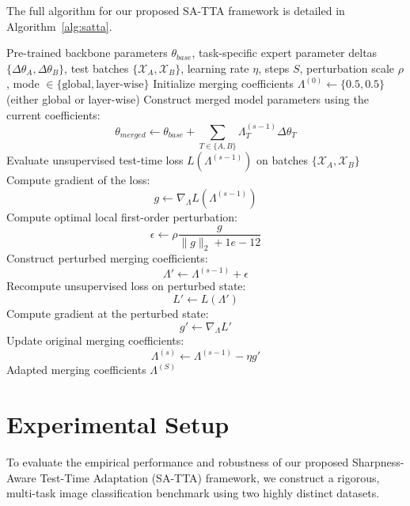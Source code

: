 \documentclass{article}
\theoremstyle{plain}
\theoremstyle{definition}
\theoremstyle{remark}
\begin{document}
The full algorithm for our proposed SA-TTA framework is detailed in Algorithm~\ref{alg:satta}.

\begin{algorithm}[!htbp]
\caption{Sharpness-Aware Test-Time Adaptation (SA-TTA)}
\label{alg:satta}
\begin{algorithmic}[1]
\REQUIRE Pre-trained backbone parameters $\theta_{base}$, task-specific expert parameter deltas $\{\Delta\theta_A, \Delta\theta_B\}$, test batches $\{\mathcal{X}_A, \mathcal{X}_B\}$, learning rate $\eta$, steps $S$, perturbation scale $\rho$, mode $\in \{\text{global}, \text{layer-wise}\}$
\STATE Initialize merging coefficients $\Lambda^{(0)} \leftarrow \{0.5, 0.5\}$ (either global or layer-wise)
    \STATE Construct merged model parameters using the current coefficients:
    $$\theta_{merged} \leftarrow \theta_{base} + \sum_{T \in \{A, B\}} \Lambda_T^{(s-1)} \Delta\theta_T$$
    \STATE Evaluate unsupervised test-time loss $L(\Lambda^{(s-1)})$ on batches $\{\mathcal{X}_A, \mathcal{X}_B\}$
    \STATE Compute gradient of the loss:
    $$g \leftarrow \nabla_\Lambda L(\Lambda^{(s-1)})$$
    \STATE Compute optimal local first-order perturbation:
    $$\epsilon \leftarrow \rho \frac{g}{\|g\|_2 + 1e-12}$$
    \STATE Construct perturbed merging coefficients:
    $$\Lambda' \leftarrow \Lambda^{(s-1)} + \epsilon$$
    \STATE Recompute unsupervised loss on perturbed state:
    $$L' \leftarrow L(\Lambda')$$
    \STATE Compute gradient at the perturbed state:
    $$g' \leftarrow \nabla_\Lambda L'$$
    \STATE Update original merging coefficients:
    $$\Lambda^{(s)} \leftarrow \Lambda^{(s-1)} - \eta g'$$
\ENDFOR
\ENSURE Adapted merging coefficients $\Lambda^{(S)}$
\end{algorithmic}
\end{algorithm}

\section{Experimental Setup}
\label{sec:experiments}

To evaluate the empirical performance and robustness of our proposed Sharpness-Aware Test-Time Adaptation (SA-TTA) framework, we construct a rigorous, multi-task image classification benchmark using two highly distinct datasets. 
\end{document}
